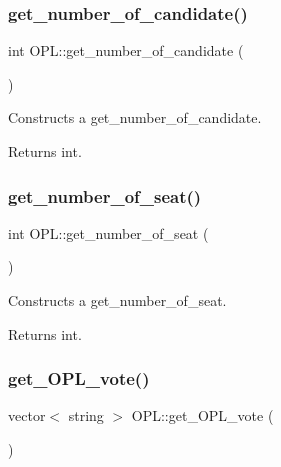 \subsubsection{\texorpdfstring{get\+\_\+number\+\_\+of\+\_\+candidate()}{get\_number\_of\_candidate()}}
{\footnotesize\ttfamily int O\+P\+L\+::get\+\_\+number\+\_\+of\+\_\+candidate (\begin{DoxyParamCaption}{ }\end{DoxyParamCaption})}



Constructs a get\+\_\+number\+\_\+of\+\_\+candidate. 

\begin{DoxyReturn}{Returns}
int. 
\end{DoxyReturn}
\mbox{\label{classOPL_a33a05c88d7819a6f5f51d60a5801e63c}} 
\subsubsection{\texorpdfstring{get\+\_\+number\+\_\+of\+\_\+seat()}{get\_number\_of\_seat()}}
{\footnotesize\ttfamily int O\+P\+L\+::get\+\_\+number\+\_\+of\+\_\+seat (\begin{DoxyParamCaption}{ }\end{DoxyParamCaption})}



Constructs a get\+\_\+number\+\_\+of\+\_\+seat. 

\begin{DoxyReturn}{Returns}
int. 
\end{DoxyReturn}
\mbox{\label{classOPL_a5eaebfc6fd65265f4cffe9acca031c85}} 
\subsubsection{\texorpdfstring{get\+\_\+\+O\+P\+L\+\_\+vote()}{get\_OPL\_vote()}}
{\footnotesize\ttfamily vector$<$ string $>$ O\+P\+L\+::get\+\_\+\+O\+P\+L\+\_\+vote (\begin{DoxyParamCaption}{ }\end{DoxyParamCaption})}



